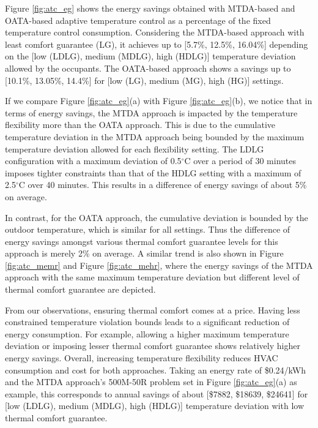 Figure \ref{fig:atc_eg} shows the energy savings obtained with MTDA-based and OATA-based adaptive temperature control as a percentage of the fixed temperature control consumption. Considering the MTDA-based approach with least comfort guarantee (LG), it achieves up to [5.7\%, 12.5\%, 16.04\%] depending on the [low (LDLG), medium (MDLG), high (HDLG)] temperature deviation allowed by the occupants. The OATA-based approach shows a savings up to [10.1\%, 13.05\%, 14.4\%] for [low (LG), medium (MG), high (HG)] settings. 

If we compare Figure \ref{fig:atc_eg}(a) with Figure \ref{fig:atc_eg}(b), we notice that in terms of energy savings, the MTDA approach is impacted by the temperature flexibility more than the OATA approach. 
This is due to the cumulative temperature deviation in the MTDA approach being bounded by the maximum temperature deviation allowed for each flexibility setting. The LDLG configuration with a maximum deviation of 0.5$^\circ$C over a period of 30 minutes imposes tighter constraints than that of the HDLG setting with a maximum of 2.5$^\circ$C over 40 minutes. This results in a difference of energy savings of about 5\% on average.

In contrast, for the OATA approach, the cumulative deviation is bounded by the outdoor temperature, which is similar for all settings. Thus the difference of energy savings amongst various thermal comfort guarantee levels for this approach is merely 2\% on average. A similar trend is also shown in Figure \ref{fig:atc_memr} and Figure \ref{fig:atc_mehr}, where the energy savings of the MTDA approach with the same maximum temperature deviation but different level of thermal comfort guarantee are depicted. 

From our observations, ensuring thermal comfort comes at a price. Having less constrained temperature violation bounds leads to a significant reduction of energy consumption. For example, allowing a higher maximum temperature deviation or imposing lesser thermal comfort guarantee shows relatively higher energy savings. Overall, increasing temperature flexibility reduces HVAC consumption and cost for both approaches. Taking an energy rate of \$0.24/kWh and the MTDA approach's 500M-50R problem set in Figure \ref{fig:atc_eg}(a) as example, this corresponds to annual savings of about [\$7882, \$18639, \$24641] for [low (LDLG), medium (MDLG), high (HDLG)] temperature deviation with low thermal comfort guarantee.


